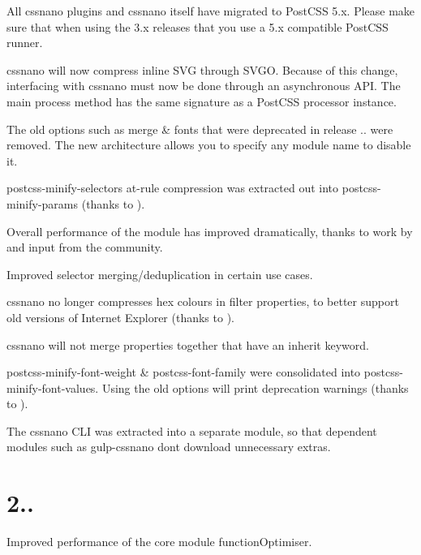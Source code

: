 \begin{DoxyItemize}
\item All cssnano plugins and cssnano itself have migrated to Post\+C\+SS 5.\+x. Please make sure that when using the 3.\+x releases that you use a 5.\+x compatible Post\+C\+SS runner.
\item cssnano will now compress inline S\+VG through S\+V\+GO. Because of this change, interfacing with cssnano must now be done through an asynchronous A\+PI. The main {\ttfamily process} method has the same signature as a Post\+C\+SS processor instance.
\item The old options such as {\ttfamily merge} \& {\ttfamily fonts} that were deprecated in release {..} were removed. The new architecture allows you to specify any module name to disable it.
\item postcss-\/minify-\/selectors\textquotesingle{} at-\/rule compression was extracted out into postcss-\/minify-\/params (thanks to ).
\item Overall performance of the module has improved dramatically, thanks to work by  and input from the community.
\item Improved selector merging/deduplication in certain use cases.
\item cssnano no longer compresses hex colours in filter properties, to better support old versions of Internet Explorer (thanks to ).
\item cssnano will not merge properties together that have an {\ttfamily inherit} keyword.
\item postcss-\/minify-\/font-\/weight \& postcss-\/font-\/family were consolidated into postcss-\/minify-\/font-\/values. Using the old options will print deprecation warnings (thanks to ).
\item The cssnano C\+LI was extracted into a separate module, so that dependent modules such as gulp-\/cssnano don\textquotesingle{}t download unnecessary extras.
\end{DoxyItemize}

\section*{2..}


\begin{DoxyItemize}
\item Improved performance of the core module {\ttfamily function\+Optimiser}.
\end{DoxyItemize}

